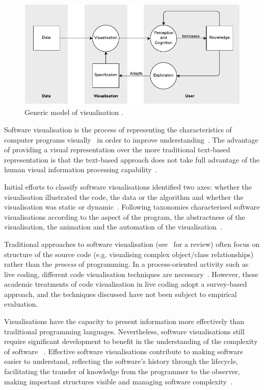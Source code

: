 \begin{figure}
  \centering \includegraphics[width=\columnwidth]{../images/diagrams/wijk-model-of-visualisation.pdf}
  \caption{Generic model of visualisation \protect\cite{VanWijk2005}.}
\label{fig:model-of-visualisation}
\end{figure} 

Software visualisation is the process of representing the characteristics of computer programs visually~\cite{Stasko1992} in order to improve understanding~\cite{Diehl2007}. The advantage of providing a visual representation over the more traditional text-based representation is that the text-based approach does not take full advantage of the human visual information processing capability~\cite{Myers1989}.

Initial efforts to classify software visualisations identified two axes: whether the visualisation illustrated the code, the data or the algorithm and whether the visualisation was static or dynamic~\cite{Myers1989}. Following taxonomies characterised software visualisations according to the aspect of the program, the abstractness of the visualisation, the animation and the automation of the visualisation~\cite{Stasko1992}.

Traditional approaches to software visualisation (see~\cite{Novais2013} for a review) often focus on structure of the source code (e.g. visualising complex object/class relationships) rather than the \emph{process} of programming. In a process-oriented activity such as live coding, different code visualisation techniques are necessary~\cite{McLean2010a,Magnusson2013}. However, these academic treatments of code visualisation in live coding adopt a survey-based approach, and the techniques discussed have not been subject to empirical evaluation.

Visualisations have the capacity to present information more effectively than traditional programming languages. Nevertheless, software visualisations still require significant development to benefit in the understanding of the complexity of software ~\cite{Baecker1995}. Effective software visualisations contribute to making software easier to understand, reflecting the software's history through the lifecycle, facilitating the transfer of knowledge from the programmer to the observer, making important structures visible and managing software complexity~\cite{Baecker1995}.

